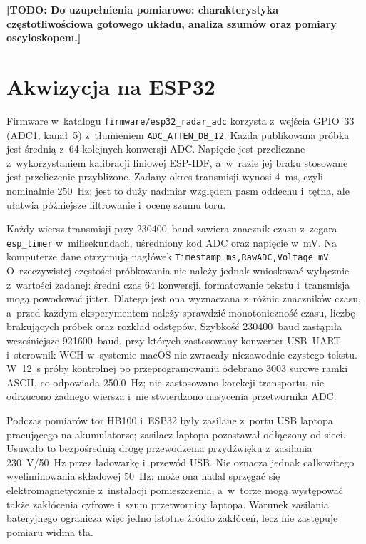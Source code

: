 \documentclass[12pt,a4paper,oneside]{report}
\newcommand{\todo}[1]{\textcolor{red!75!black}{\textbf{[TODO: #1]}}}
\newcommand{\miejsce}[1]{\todo{#1}}
\begin{document}
\miejsce{Do uzupełnienia pomiarowo: charakterystyka częstotliwościowa gotowego
układu, analiza szumów oraz pomiary oscyloskopem.}

\section{Akwizycja na ESP32}
Firmware w~katalogu \texttt{firmware/esp32\_radar\_adc} korzysta z~wejścia
GPIO~33 (ADC1, kanał~5) z~tłumieniem \texttt{ADC\_ATTEN\_DB\_12}. Każda
publikowana próbka jest średnią z~64 kolejnych konwersji ADC. Napięcie jest
przeliczane z~wykorzystaniem kalibracji liniowej ESP-IDF, a~w~razie jej braku
stosowane jest przeliczenie przybliżone. Zadany okres transmisji wynosi
\SI{4}{ms}, czyli nominalnie \SI{250}{Hz}; jest to duży nadmiar względem pasm
oddechu i~tętna, ale ułatwia późniejsze filtrowanie i~ocenę szumu toru.

Każdy wiersz transmisji przy \SI{230400}{baud} zawiera znacznik czasu z~zegara
\texttt{esp\_timer} w~milisekundach, uśredniony kod ADC oraz napięcie w~mV.
Na komputerze dane otrzymują nagłówek
\texttt{Timestamp\_ms,RawADC,Voltage\_mV}. O~rzeczywistej częstości próbkowania
nie należy jednak wnioskować wyłącznie z~wartości zadanej: średni czas 64
konwersji, formatowanie tekstu i~transmisja mogą powodować jitter. Dlatego jest
ona wyznaczana z~różnic znaczników czasu, a~przed każdym eksperymentem należy
sprawdzić monotoniczność czasu, liczbę brakujących próbek oraz rozkład odstępów.
Szybkość \SI{230400}{baud} zastąpiła wcześniejsze \SI{921600}{baud}, przy
których zastosowany konwerter USB--UART i~sterownik WCH w~systemie macOS nie
zwracały niezawodnie czystego tekstu. W~\SI{12}{s} próby kontrolnej po
przeprogramowaniu odebrano 3003 surowe ramki ASCII, co odpowiada
\SI{250.0}{Hz}; nie zastosowano korekcji transportu, nie odrzucono żadnego
wiersza i~nie stwierdzono nasycenia przetwornika ADC.

Podczas pomiarów tor HB100 i~ESP32 były zasilane z~portu USB laptopa
pracującego na akumulatorze; zasilacz laptopa pozostawał odłączony od sieci.
Usuwało to bezpośrednią drogę przewodzenia przydźwięku z~zasilania
\SI{230}{V}/\SI{50}{Hz} przez ładowarkę i~przewód USB. Nie oznacza jednak
całkowitego wyeliminowania składowej \SI{50}{Hz}: może ona nadal sprzęgać się
elektromagnetycznie z~instalacji pomieszczenia, a~w~torze mogą występować także
zakłócenia cyfrowe i~szum przetwornicy laptopa. Warunek zasilania bateryjnego
ogranicza więc jedno istotne źródło zakłóceń, lecz nie zastępuje pomiaru widma
tła.
\end{document}
